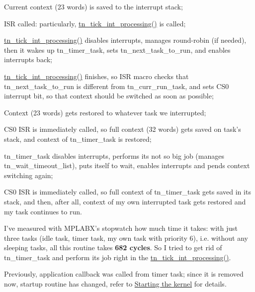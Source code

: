 \begin{DoxyItemize}
\item Current context (23 words) is saved to the interrupt stack;
\item I\+S\+R called\+: particularly, {\ttfamily \hyperlink{tn__sys_8h_a944d96c7a5d442d271115b6cb22a085b}{tn\+\_\+tick\+\_\+int\+\_\+processing()}} is called;
\item {\ttfamily \hyperlink{tn__sys_8h_a944d96c7a5d442d271115b6cb22a085b}{tn\+\_\+tick\+\_\+int\+\_\+processing()}} disables interrupts, manages round-\/robin (if needed), then it wakes up {\ttfamily tn\+\_\+timer\+\_\+task}, sets {\ttfamily tn\+\_\+next\+\_\+task\+\_\+to\+\_\+run}, and enables interrupts back;
\item {\ttfamily \hyperlink{tn__sys_8h_a944d96c7a5d442d271115b6cb22a085b}{tn\+\_\+tick\+\_\+int\+\_\+processing()}} finishes, so I\+S\+R macro checks that {\ttfamily tn\+\_\+next\+\_\+task\+\_\+to\+\_\+run} is different from {\ttfamily tn\+\_\+curr\+\_\+run\+\_\+task}, and sets {\ttfamily C\+S0} interrupt bit, so that context should be switched as soon as possible;
\item Context (23 words) gets restored to whatever task we interrupted;
\item {\ttfamily C\+S0} I\+S\+R is immediately called, so full context (32 words) gets saved on task's stack, and context of {\ttfamily tn\+\_\+timer\+\_\+task} is restored;
\item {\ttfamily tn\+\_\+timer\+\_\+task} disables interrupts, performs its not so big job (manages {\ttfamily tn\+\_\+wait\+\_\+timeout\+\_\+list}), puts itself to wait, enables interrupts and pends context switching again;
\item {\ttfamily C\+S0} I\+S\+R is immediately called, so full context of {\ttfamily tn\+\_\+timer\+\_\+task} gets saved in its stack, and then, after all, context of my own interrupted task gets restored and my task continues to run.
\end{DoxyItemize}

I've measured with M\+P\+L\+A\+B\+X's stopwatch how much time it takes\+: with just three tasks (idle task, timer task, my own task with priority 6), i.\+e. without any sleeping tasks, all this routine takes {\bfseries 682 cycles}. So I tried to get rid of {\ttfamily tn\+\_\+timer\+\_\+task} and perform its job right in the {\ttfamily \hyperlink{tn__sys_8h_a944d96c7a5d442d271115b6cb22a085b}{tn\+\_\+tick\+\_\+int\+\_\+processing()}}.

Previously, application callback was called from timer task; since it is removed now, startup routine has changed, refer to \hyperlink{quick_guide_starting_the_kernel}{Starting the kernel} for details.

